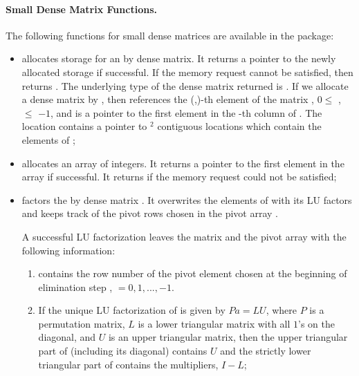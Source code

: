 \paragraph{Small Dense Matrix Functions.}
The following functions for small dense matrices are available in the
{\dense} package:
%
\begin{itemize}

\item {}
  \par {} allocates storage for an   by  dense matrix. 
  It returns a pointer to the newly allocated storage if            
  successful. If the memory request cannot be satisfied, then    
   returns . The underlying type of the dense matrix 
  returned is . If we allocate a dense matrix  by 
  , then  references the (,)-th element   
  of the matrix , $0 \le$ ,  $\le$ $-1$, and  
  is a pointer to the first element in the -th column of . 
  The location  contains a pointer to $^2$ contiguous locations which contain   
  the elements of ;

\item {}
  \par {} allocates an array of  integers. 
  It returns a pointer to the first element in the array if successful. 
  It returns  if the memory request could not be satisfied;

\item {}
  \par {} factors the  by  dense matrix . 
  It overwrites the elements of  with its LU factors and keeps track of the
  pivot rows chosen in the pivot array .

  A successful LU factorization leaves the matrix  and the      
  pivot array  with the following information:                  
  \begin{enumerate}
  \item 
     contains the row number of the pivot element chosen   
    at the beginning of elimination step ,  $ = 0, 1, ..., $$-1$.  
                                                                 
  \item 
    If the unique LU factorization of  is given by $Pa = LU$,   
    where $P$ is a permutation matrix, $L$ is a lower triangular   
    matrix with all $1$'s on the diagonal, and $U$ is an upper     
    triangular matrix, then the upper triangular part of      
    (including its diagonal) contains $U$ and the strictly lower 
    triangular part of  contains the multipliers, $I-L$;       
                                                                  

\end{enumerate}
\end{itemize}
